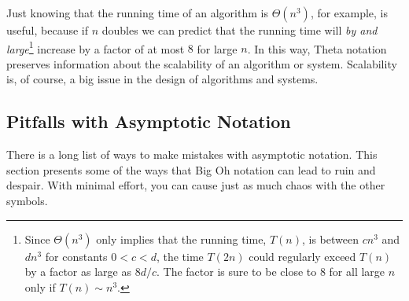 Just knowing that the running time of an algorithm is $\Theta(n^3)$,
for example, is useful, because if $n$ doubles we can predict that the
running time will \emph{by and large}\footnote{Since $\Theta(n^3)$
  only implies that the running time, $T(n)$, is between $cn^3$ and
  $dn^3$ for constants $0<c<d$, the time $T(2n)$ could regularly
  exceed $T(n)$ by a factor as large as $8d/c$.  The factor is sure to
  be close to 8 for all large $n$ only if $T(n) \sim n^3$.} increase
by a factor of at most $8$ for large $n$.  In this way, Theta notation
preserves information about the scalability of an algorithm or system.
Scalability is, of course, a big issue in the design of algorithms and
systems.


\subsection{Pitfalls with Asymptotic Notation}

There is a long list of ways to make mistakes with asymptotic
notation.  This section presents some of the ways that Big Oh notation
can lead to ruin and despair.  With minimal effort, you can cause just
as much chaos with the other symbols.

